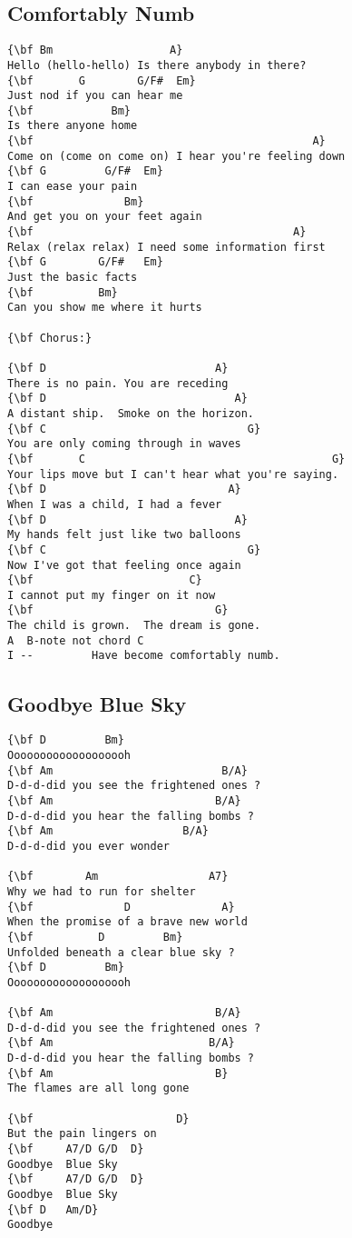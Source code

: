 \documentclass[a4paper]{article}
\begin{document}
\subsection{Comfortably Numb} %
\label{sub:Comfortably Num}
\begin{Verbatim}[commandchars=\\\{\}]
{\bf Bm				     A}
Hello (hello-hello) Is there anybody in there?
{\bf       G        G/F#  Em}
Just nod if you can hear me
{\bf            Bm}
Is there anyone home
{\bf                                           A}
Come on (come on come on) I hear you're feeling down
{\bf G         G/F#  Em}
I can ease your pain
{\bf              Bm}
And get you on your feet again
{\bf                                        A}
Relax (relax relax) I need some information first
{\bf G        G/F#   Em}
Just the basic facts
{\bf          Bm}
Can you show me where it hurts

{\bf Chorus:}

{\bf D                          A}
There is no pain. You are receding
{\bf D                             A}
A distant ship.  Smoke on the horizon.
{\bf C                               G}
You are only coming through in waves
{\bf       C                                      G}
Your lips move but I can't hear what you're saying.
{\bf D                            A}
When I was a child, I had a fever
{\bf D                             A}
My hands felt just like two balloons
{\bf C                               G}
Now I've got that feeling once again
{\bf                        C}
I cannot put my finger on it now
{\bf                            G}
The child is grown.  The dream is gone.
A  B-note not chord C
I --         Have become comfortably numb.
\end{Verbatim}
\newpage
\subsection{Goodbye Blue Sky} %
\label{sub:Goodbye Blue Sky}
\begin{Verbatim}[commandchars=\\\{\}]
{\bf D         Bm}
Ooooooooooooooooooh
{\bf Am                          B/A}
D-d-d-did you see the frightened ones ?
{\bf Am                         B/A}
D-d-d-did you hear the falling bombs ?
{\bf Am                    B/A}
D-d-d-did you ever wonder

{\bf        Am                 A7}
Why we had to run for shelter
{\bf              D              A}
When the promise of a brave new world
{\bf          D         Bm}
Unfolded beneath a clear blue sky ?
{\bf D         Bm}
Ooooooooooooooooooh

{\bf Am                         B/A}
D-d-d-did you see the frightened ones ?
{\bf Am                        B/A}
D-d-d-did you hear the falling bombs ?
{\bf Am                         B}
The flames are all long gone

{\bf                      D}
But the pain lingers on
{\bf     A7/D G/D  D}
Goodbye  Blue Sky
{\bf     A7/D G/D  D}
Goodbye  Blue Sky
{\bf D   Am/D}
Goodbye
\end{Verbatim}
\newpage
\end{document}
